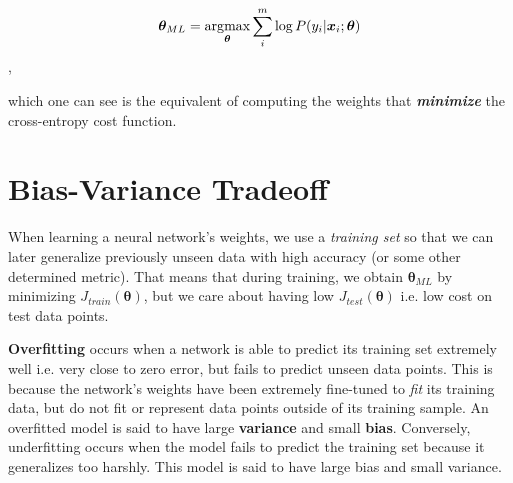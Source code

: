 \[\bm{\theta}_{ML} = \operatorname*{\arg\!\max}_{\bm{\theta}} \sum_{i}^{m} \log P(y_{i}|\bm{x}_{i};\bm{\theta})\],

which one can see is the equivalent of computing the weights that \textbf{\textit{minimize}} the cross-entropy cost function.




\section{Bias-Variance Tradeoff}
When learning a neural network's weights, we use a \textit{training set} so that we can later generalize
previously unseen data with high accuracy (or some other determined metric). That means that during training, we
obtain $\bm{\theta}_{ML}$ by minimizing $J_{train}(\bm{\theta})$, but we care about having low $J_{test}(\bm{\theta})$ i.e. low cost
on test data points.

\textbf{Overfitting} occurs when a network is able to predict its training set extremely well i.e. very close to zero error, but fails to predict
unseen data points. This is because the network's weights have been extremely fine-tuned to \textit{fit} its training data, but do not fit or represent
data points outside of its training sample.
An overfitted model is said to have large \textbf{variance} and small \textbf{bias}. Conversely, underfitting occurs when the model fails to predict
the training set because it generalizes too harshly. This model is said to have large bias and small variance.

